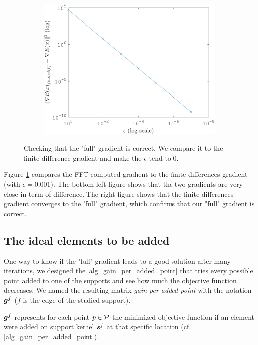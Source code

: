 \begin{figure}[!ht]
\begin{subfigure}[b]{0.35\textwidth}\centering
\includegraphics[width=\textwidth]{figures/verif_gradient/finite-diff-vs-grad.png}
\end{subfigure}
\caption{Checking that the "full" gradient is correct. We compare it to the finite-difference gradient and make the $\epsilon$ tend to 0.} \label{fig_verif_gradient}
\end{figure}

Figure \ref{fig_verif_gradient} compares the FFT-computed gradient to the finite-differences gradient (with $\epsilon=0.001$). The bottom left figure shows that the two gradients are very close in term of difference. The right figure shows that the finite-differences gradient converges to the "full" gradient, which confirms that our "full" gradient is correct.

\subsection{The ideal elements to be added}\label{sec_gain_per_added_point}

One way to know if the "full" gradient leads to a good solution after many iterations, we designed the \cref{alg_gain_per_added_point} that tries every possible point added to one of the supports and see how much the objective function decreases. We named the resulting matrix \emph{gain-per-added-point} with the notation $\g^f$ ($f$ is the edge of the studied support).

$\g^f$ represents for each point $p \in \P$ the minimized objective function if an element were added on support kernel $\s^f$ at that specific location (cf. \cref{alg_gain_per_added_point}).


